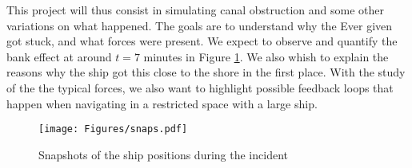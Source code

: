 \documentclass[a4paper]{article}
\begin{document}
\begin{center}
\end{center}

This project will thus consist in simulating canal obstruction and some other variations on what happened. The goals are to understand why the Ever given got stuck, and what forces were present. We expect to observe and quantify the bank effect at around $t=7$ minutes in Figure \ref{fig:snaps}. We also whish to explain the reasons why the ship got this close to the shore in the first place. With the study of the the typical forces, we also want to highlight possible feedback loops that happen when navigating in a restricted space with a large ship.

\begin{figure}[hbtb]
    \centering
	\texttt{[image: Figures/snaps.pdf]}
	\caption{Snapshots of the ship positions during the incident}
	\label{fig:snaps}
\end{figure}
\end{document}

